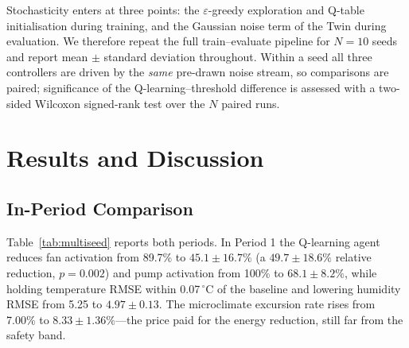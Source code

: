 \documentclass[conference]{IEEEtran}
\begin{document}
Stochasticity enters at three points: the $\varepsilon$-greedy exploration and
Q-table initialisation during training, and the Gaussian noise term of the Twin
during evaluation. We therefore repeat the full train--evaluate pipeline for
$N=10$ seeds and report mean $\pm$ standard deviation throughout. Within a seed
all three controllers are driven by the \emph{same} pre-drawn noise stream, so
comparisons are paired; significance of the Q-learning--threshold difference is
assessed with a two-sided Wilcoxon signed-rank test over the $N$ paired runs.

\section{Results and Discussion}

\subsection{In-Period Comparison}
Table~\ref{tab:multiseed} reports both periods. In Period 1 the Q-learning agent
reduces fan activation from 89.7\% to $45.1\pm16.7\%$ (a $49.7\pm18.6\%$ relative
reduction, $p=0.002$) and pump activation from 100\% to $68.1\pm8.2\%$, while
holding temperature RMSE within 0.07\,$^{\circ}$C of the baseline and lowering
humidity RMSE from 5.25 to $4.97\pm0.13$. The microclimate excursion rate rises
from 7.00\% to $8.33\pm1.36\%$---the price paid for the energy reduction, still
far from the safety band.
\end{document}
